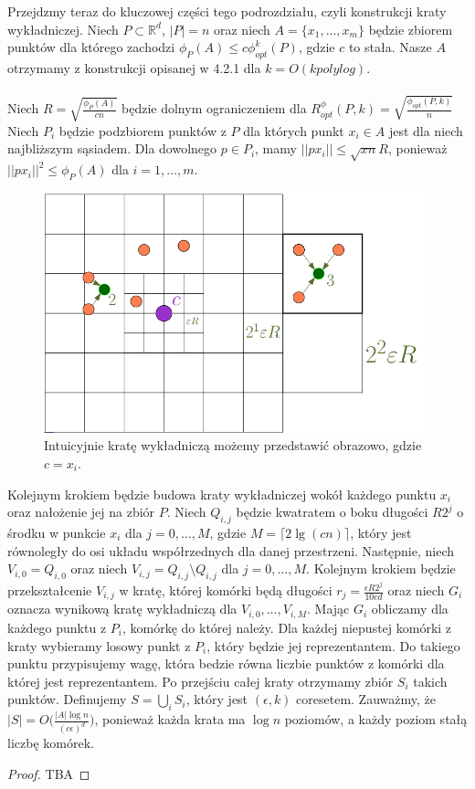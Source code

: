Przejdzmy teraz do kluczowej części tego podrozdziału, czyli konstrukcji kraty wykładniczej.
Niech $P \subset \mathbb{R}^d$, $|P| = n$ oraz niech $A = \{x_{1}, \dots, x_{m}\}$ będzie zbiorem punktów dla którego zachodzi $\phi_{P}(A) \leq c\phi_{opt}^{k}(P)$, gdzie $c$ to stała.
Nasze $A$ otrzymamy z konstrukcji opisanej w 4.2.1 dla $k = O(k polylog)$.
\\~\\
Niech $R = \sqrt{\frac{\phi_{P}(A)}{cn}}$ będzie dolnym ograniczeniem dla $R_{opt}^{\phi}(P, k) = \sqrt{\frac{\phi_{opt}(P, k)}{n}}$
Niech $P_{i}$ będzie podzbiorem punktów z $P$ dla których punkt $x_{i} \in A$ jest dla niech najbliższym sąsiadem. 
Dla dowolnego $p \in P_{i}$, mamy $||px_{i}|| \leq \sqrt{xn}R$, ponieważ $||px_{i}||^{2} \leq \phi_{P}(A)$ dla $i = 1, \dots, m$.
\begin{figure}[H]
    \centering
    \includegraphics[totalheight=4cm]{grid.png}
    \caption{Intuicyjnie kratę wykładniczą możemy przedstawić obrazowo, gdzie $c = x_{i}$.}
\end{figure}
\noindent
Kolejnym krokiem będzie budowa kraty wykładniczej wokół każdego punktu $x_{i}$ oraz nałożenie jej na zbiór $P$.
Niech $Q_{i,j}$ będzie kwatratem o boku długości $R2^{j}$ o środku w punkcie $x_{i}$ dla $j = 0, \dots, M$, gdzie $M = \lceil 2 \lg(cn) \rceil$, który jest równoległy do osi układu współrzednych dla danej przestrzeni.
Następnie, niech $V_{i, 0} = Q_{i, 0}$ oraz niech $V_{i,j} = Q_{i,j} \setminus Q_{i,j}$ dla $j = 0, \dots, M$.
Kolejnym krokiem będzie przekształcenie $V_{i,j}$ w kratę, której komórki będą długości $r_{j} = \frac{\epsilon R2^{j}}{10cd}$ oraz niech $G_{i}$ oznacza wynikową kratę wykładniczą dla $V_{i,0}, \dots, V_{i,M}$.
Mając $G_{i}$ obliczamy dla każdego punktu z $P_{i}$, komórkę do której należy.
Dla każdej niepustej komórki z kraty wybieramy losowy punkt z $P_{i}$, który będzie jej reprezentantem.
Do takiego punktu przypisujemy wagę, która bedzie równa liczbie punktów z komórki dla której jest reprezentantem.
Po przejściu całej kraty otrzymamy zbiór $S_{i}$ takich punktów.
Definujemy $S = \bigcup_{i} S_{i}$, który jest  $(\epsilon, k)$ coresetem.
Zauważmy, że $|S| = O\Big( \frac{|A| \log n }{ (c\epsilon)^{d} } \Big)$, ponieważ każda krata ma $\log n$ poziomów, a każdy poziom stałą liczbę komórek.
\begin{proof}
    TBA
\end{proof}
